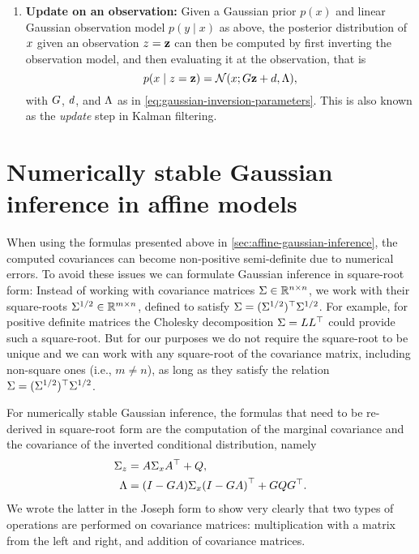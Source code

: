 \documentclass{mimosis}
\begin{document}
\begin{enumerate}
\item \textbf{Update on an observation:}
Given a Gaussian prior \(p(x)\) and linear Gaussian observation model \(p(y \mid x)\) as above, the posterior distribution of \(x\) given an observation \(z=\mathbf{z}\) can then be computed by first inverting the observation model, and then evaluating it at the observation, that is
\begin{equation}
\p(\st \mid \obs=\mathbf{\obs})
= \N( \st; \invtransA \mathbf{\obs} + \invtransb, \invtransC ),
\end{equation}
with \(G\), \(d\), and \(\Lambda\) as in \cref{eq:gaussian-inversion-parameters}.
This is also known as the \emph{update} step in Kalman filtering.
\end{enumerate}
\section{Numerically stable Gaussian inference in affine models}
\label{sec:orgb087e2e}
\label{sec:stable-affine-gaussian-inference}
When using the formulas presented above
in \cref{sec:affine-gaussian-inference},
the computed covariances can become non-positive semi-definite due to numerical errors.
To avoid these issues we can formulate Gaussian inference in square-root form:
Instead of working with covariance matrices \({\Sigma \in \mathbb{R}^{n \times n}}\),
we work with their square-roots \(\Sigma^{1/2} \in \mathbb{R}^{m \times n}\), defined to satisfy \(\Sigma = (\Sigma^{1/2})^\top \Sigma^{1/2}\).
For example, for positive definite matrices the Cholesky decomposition \(\Sigma = L L^\top\) could provide such a square-root.
But for our purposes we do not require the square-root to be unique and we can work with any square-root of the covariance matrix, including non-square ones (i.e., \(m \neq n\)), as long as they satisfy the relation \(\Sigma = (\Sigma^{1/2})^\top \Sigma^{1/2}\).

For numerically stable Gaussian inference, the formulas that need to be re-derived in square-root form are the computation of the marginal covariance and the covariance of the inverted conditional distribution, namely
\begin{subequations}\label{eq:gaussian-inference-required-cov-operations}
\begin{align}
\cov{\obs} &= \transA \cov{\st} \transA^\T + \transC, \\
\invtransC &= \left( I - \invtransA \transA \right) \cov{\st} \left( I - \invtransA \transA \right)^\T + \invtransA \transC \invtransA^\T.
\end{align}
\end{subequations}
We wrote the latter in the Joseph form to show very clearly that two types of operations are performed on covariance matrices:
multiplication with a matrix from the left and right, and addition of covariance matrices.
\end{document}
